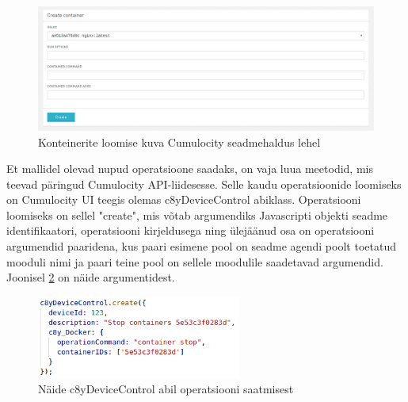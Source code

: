 \documentclass[12pt]{article}
\begin{document}
  \FloatBarrier
 
  \begin{figure} [ht] %
  \begin{center}
  \includegraphics[width=1\textwidth]{webplugin_containers_run}
  \caption{Konteinerite loomise kuva Cumulocity seadmehaldus lehel}
  \label{fig:webplugin_containers_run}
  \end{center}
  \end{figure}
  
  \FloatBarrier
 
 
  Et mallidel olevad nupud operatsioone saadaks, on vaja luua meetodid, mis teevad päringud
  Cumulocity API-liidesesse.
  Selle kaudu operatsioonide loomiseks on Cumulocity UI teegis olemas c8yDeviceControl abiklass.
  Operatsiooni loomiseks on sellel "create", mis võtab argumendiks Javascripti objekti
  seadme identifikaatori, operatsiooni kirjeldusega ning ülejäänud osa on operatsiooni argumendid
  paaridena, kus paari esimene pool on seadme agendi poolt toetatud mooduli nimi ja paari teine
  pool on sellele moodulile saadetavad argumendid. Joonisel \ref{fig:webplugin_operationsendexample}
  on näide argumentidest.
 
  \begin{figure} [ht] %
  \begin{center}
  \includegraphics[width=0.6\textwidth]{webplugin_operationsendexample}
  \caption{Näide c8yDeviceControl abil operatsiooni saatmisest}
  \label{fig:webplugin_operationsendexample}
  \end{center}
  \end{figure}
  
\end{document}
